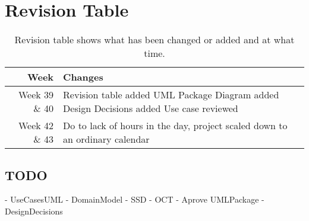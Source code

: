\section{Revision Table}
\begin{table*}[ht]\centering
  \begin{tabularx}{\textwidth}{@{}rX@{}}
    \toprule
    \textbf{Week} & \textbf{Changes} \\\hline
    Week 39 \& 40 & Revision table added\newline  
		    		UML Package Diagram added\newline
		    		Design Decisions added\newline
		    		Use case reviewed\\\hline
	Week 42 \& 43 & Do to lack of hours in the day, project scaled down to an ordinary calendar \\
    \bottomrule
  \end{tabularx}
  \caption{Revision table shows what has been changed or added and at what time.}
  \label{glossary}\centering
\end{table*}

\subsection{TODO}
- UseCasesUML \newline
- DomainModel \newline
- SSD \newline
- OCT \newline
- Aprove UMLPackage \newline
- DesignDecisions \newline

\newpage